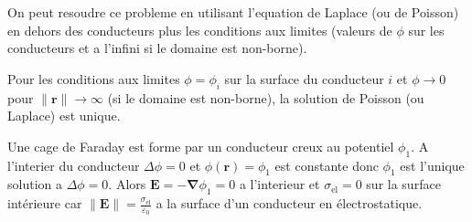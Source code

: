 On peut resoudre ce probleme en utilisant l'equation de Laplace (ou de Poisson) en dehors des conducteurs plus les conditions aux limites (valeurs de $\phi$ sur les conducteurs et a l'infini si le domaine est non-borne). 

Pour les conditions aux limites $\phi=\phi _{i}$ sur la surface du conducteur $i$ et $\phi \to0$ pour $\lVert \boldsymbol{r} \rVert\to \infty$ (si le domaine est non-borne), la solution de Poisson (ou Laplace) est unique.
\begin{example}
Une cage de Faraday est forme par un conducteur creux au potentiel $\phi_{1}$. A l'interier du conducteur $\Delta \phi=0$ et $\phi(\boldsymbol{r})=\phi_{1}$ est constante donc $\phi_{1}$ est l'unique solution a $\Delta \phi=0$. Alors $\boldsymbol{E}=-\boldsymbol{\nabla}\phi_{1}=0$ a l'interieur et $\sigma _{\mathrm{el}}=0$ sur la surface intérieure car $\lVert \boldsymbol{E} \rVert=\frac{\sigma _{\mathrm{el}}}{\varepsilon_{0}}$ a la surface d'un conducteur en électrostatique.
\end{example}